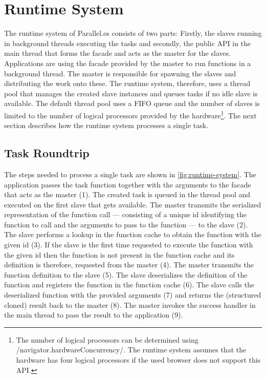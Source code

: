 \section{Runtime System}\label{sec:runtime-system}
The runtime system of Parallel.es consists of two parts: Firstly, the slaves running in background threads executing the tasks and secondly, the public API in the main thread that forms the facade and acts as the master for the slaves. Applications are using the facade provided by the master to run functions in a background thread. The master is responsible for spawning the slaves and distributing the work onto these. The runtime system, therefore, uses a thread pool that manages the created slave instances and queues tasks if no idle slave is available. The default thread pool uses a FIFO queue and the number of slaves is limited to the number of logical processors provided by the hardware\footnote{The number of logical processors can be determined using \javascriptinline/navigator.hardwareConcurrency/. The runtime system assumes that the hardware has four logical processors if the used browser does not support this API.}. The next section describes how the runtime system processes a single task. 

\subsection{Task Roundtrip}
The steps needed to process a single task are shown in \cref{fig:runtime-system}. The application passes the task function together with the arguments to the facade that acts as the master (1). The created task is queued in the thread pool and executed on the first slave that gets available. The master transmits the serialized representation of the function call --- consisting of a unique id identifying the function to call and the arguments to pass to the function --- to the slave (2). The slave performs a lookup in the function cache to obtain the function with the given id (3). If the slave is the first time requested to execute the function with the given id then the function is not present in the function cache and its definition is therefore, requested from the master (4). The master transmits the function definition to the slave (5). The slave deserializes the definition of the function and registers the function in the function cache (6). The slave calls the deserialized function with the provided arguments (7) and returns the (structured cloned) result back to the master (8). The master invokes the success handler in the main thread to pass the result to the application (9). 

